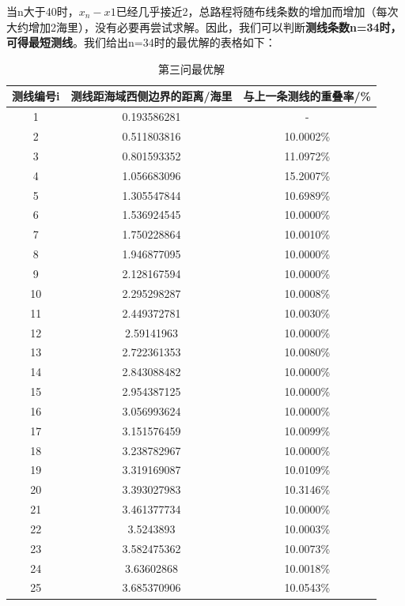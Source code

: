 \documentclass{article}
\begin{document}
	当n大于40时，$x_n-x1$已经几乎接近2，总路程将随布线条数的增加而增加（每次大约增加2海里），没有必要再尝试求解。因此，我们可以判断\textbf{测线条数n=34时，可得最短测线}。我们给出n=34时的最优解的表格如下：
	\begin{table}[H]
		\centering
		\caption{第三问最优解}
		\begin{tabular}{ccc}
			\hline
			测线编号i & 测线距海域西侧边界的距离/海里 & 与上一条测线的重叠率/\% \\ \hline
			1     & 0.193586281     & -             \\
			2     & 0.511803816     & 10.0002\%     \\
			3     & 0.801593352     & 11.0972\%     \\
			4     & 1.056683096     & 15.2007\%     \\
			5     & 1.305547844     & 10.6989\%     \\
			6     & 1.536924545     & 10.0000\%     \\
			7     & 1.750228864     & 10.0010\%     \\
			8     & 1.946877095     & 10.0000\%     \\
			9     & 2.128167594     & 10.0000\%     \\
			10    & 2.295298287     & 10.0008\%     \\
			11    & 2.449372781     & 10.0030\%     \\
			12    & 2.59141963      & 10.0000\%     \\
			13    & 2.722361353     & 10.0080\%     \\
			14    & 2.843088482     & 10.0000\%     \\
			15    & 2.954387125     & 10.0000\%     \\
			16    & 3.056993624     & 10.0000\%     \\
			17    & 3.151576459     & 10.0099\%     \\
			18    & 3.238782967     & 10.0000\%     \\
			19    & 3.319169087     & 10.0109\%     \\
			20    & 3.393027983     & 10.3146\%     \\
			21    & 3.461377734     & 10.0000\%     \\
			22    & 3.5243893       & 10.0003\%     \\
			23    & 3.582475362     & 10.0073\%     \\
			24    & 3.63602868      & 10.0018\%     \\
			25    & 3.685370906     & 10.0543\%     \\

\end{tabular}
\end{table}
\end{document}
